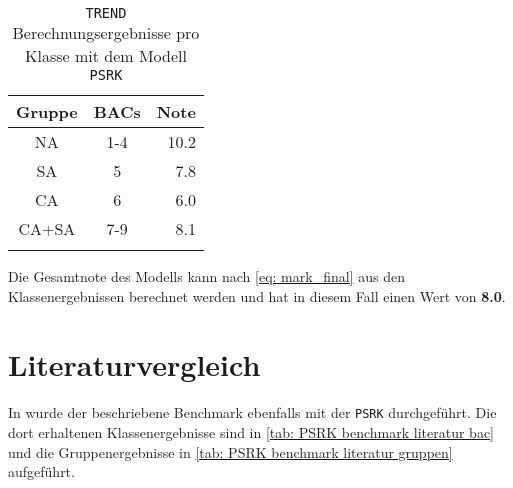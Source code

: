 \documentclass[../thesis.tex]{subfiles}
\begin{document}
\begin{table} [htb]
	\centering
	\caption{\texttt{TREND} Berechnungsergebnisse pro Klasse mit dem Modell \texttt{PSRK}}
	\begin{tabular}{ ccr }
		\hline
		Gruppe & BACs & Note  \\
		\hline
		NA & 1-4 & 10.2 \\
		SA & 5   & 7.8 \\
		CA & 6   & 6.0 \\
		CA+SA & 7-9 & 8.1 \\ 
	
		\hline
		\label{tab: meine_gesamt_ergebnisse}
	\end{tabular}
\end{table}

Die Gesamtnote des Modells kann nach \autoref{eq: mark_final} aus den Klassenergebnissen berechnet werden und hat in diesem Fall einen Wert von \textbf{8.0}.

\section{Literaturvergleich}

In \cite{moine2021} wurde der beschriebene Benchmark ebenfalls mit der \texttt{PSRK} durchgeführt. Die dort erhaltenen Klassenergebnisse sind in \autoref{tab: PSRK benchmark literatur bac} und die Gruppenergebnisse in \autoref{tab: PSRK benchmark literatur gruppen} aufgeführt.
\end{document}
